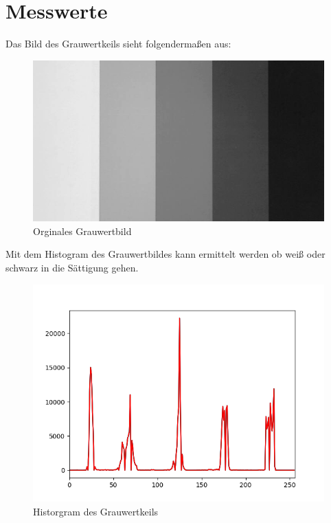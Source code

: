 \documentclass[12pt, oneside, a4paper, \docLanguage]{report}
\begin{document}
\section{Messwerte}
\label{chap:VERSUCH_1_MESSWERTE}
\begin{normalsize}
Das Bild des Grauwertkeils sieht folgendermaßen aus:
\end{normalsize}
\begin{figure}[H]
\centering
\includegraphics[scale=0.6]{../Greyscale.png}
\caption{Orginales Grauwertbild}
\end{figure}	
\pagebreak
\begin{flushleft}
Mit dem Histogram des Grauwertbildes kann ermittelt werden ob weiß oder schwarz in die Sättigung gehen.
\end{flushleft}
\begin{figure}[H]
\centering
\includegraphics[scale=0.5]{./Histograms/HistGreyscale.png}
\caption{Historgram des Grauwertkeils}
\end{figure}
\end{document}

